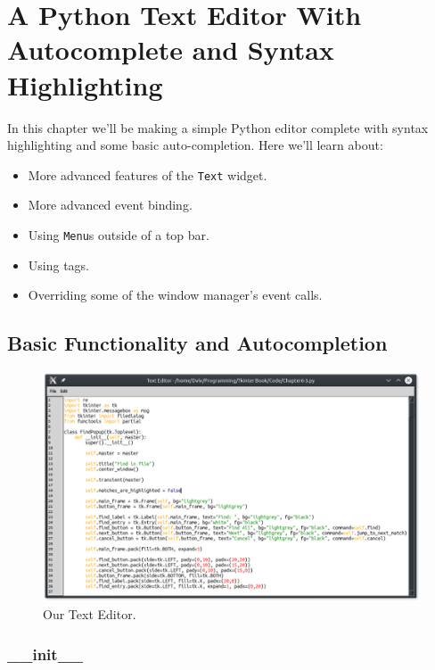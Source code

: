 \documentclass[a4paper,11pt,openany]{book}
\begin{document}
\chapter{A Python Text Editor With Autocomplete and Syntax Highlighting}
In this chapter we'll be making a simple Python editor complete with syntax highlighting and some basic auto-completion. Here we'll learn about:

\begin{itemize}
  \item More advanced features of the \lstinline[columns=fixed]{Text} widget.
  \item More advanced event binding.
  \item Using \lstinline[columns=fixed]{Menu}s outside of a top bar.
  \item Using tags.
  \item Overriding some of the window manager's event calls.
\end{itemize}

\section{Basic Functionality and Autocompletion}

\begin{figure}[h]
\centering
\includegraphics{Ch6-3}
\caption{Our Text Editor.}
\end{figure}

\newpage



\subsection{\_\_init\_\_}
\end{document}
